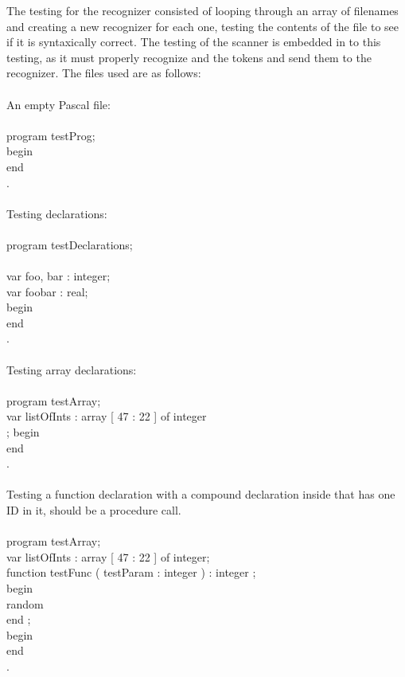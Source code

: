 \documentclass[12pt]{scrreprt}
\newcommand{\tab}{\hspace*{2em}}
\begin{document}
The testing for the recognizer consisted of looping through an array of
filenames and creating a new recognizer for each one, testing the
contents of the file to see if it is syntaxically correct. The testing
of the scanner is embedded in to this testing, as it must properly
recognize and the tokens and send them to the recognizer. The files
used are as follows:\\
\\
An empty Pascal file:\\
\\
\tab  program testProg;\\
\tab  begin\\
\tab	end\\
\tab .\\
\\
Testing declarations:\\
\\
\tab	program testDeclarations;\\
\\
\tab	var foo, bar : integer;\\
\tab	var foobar : real;\\
\tab	begin\\
\tab	end\\
\tab	.\\
\\
Testing array declarations:\\
\\
\tab	program testArray;\\
\tab	var listOfInts : array [ 47 : 22 ] of integer\\;
\tab	begin\\
\tab	end\\
\tab	.\\
	\\
Testing a function declaration with a compound declaration inside that
has one ID in it, should be a procedure call.\\
\\
\tab	program testArray;\\
\tab	var listOfInts : array [ 47 : 22 ] of integer;\\
\tab	function testFunc ( testParam : integer ) : integer ;\\
\tab	begin\\
\tab	random\\
\tab	end ;\\
\tab	begin\\
\tab	end\\
\tab	.\\
\end{document}
